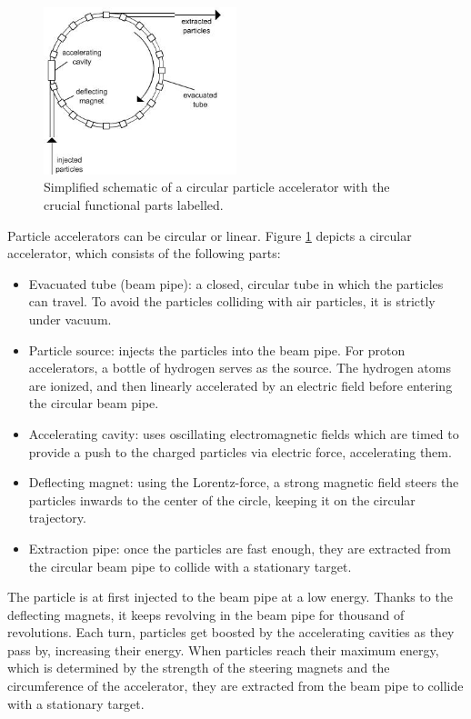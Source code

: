 \documentclass[12pt]{article}
\begin{document}
\begin{figure}[H]
	\begin{center}
		\includegraphics[width=0.5\textwidth]{particle_accelerator_schematic}
	\end{center}
	\caption[Circular particle accelerator structure]{Simplified schematic of a circular particle accelerator with the crucial functional parts labelled. \cite{accelerator_image_src_1}}
	\label{fig_part_accel_schematic}
\end{figure}

Particle accelerators can be circular or linear. Figure \ref{fig_part_accel_schematic} depicts a circular accelerator, which consists of the following parts:
\begin{itemize}
	\item Evacuated tube (beam pipe): a closed, circular tube in which the particles can travel. To avoid the particles colliding with air particles, it is strictly under vacuum.
	\item Particle source: injects the particles into the beam pipe. For proton accelerators, a bottle of hydrogen serves as the source. The hydrogen atoms are ionized, and then linearly accelerated by an electric field before entering the circular beam pipe.
	\item Accelerating cavity: uses oscillating electromagnetic fields which are timed to provide a push to the charged particles via electric force, accelerating them.
	\item Deflecting magnet: using the Lorentz-force, a strong magnetic field steers the particles inwards to the center of the circle, keeping it on the circular trajectory.
	\item Extraction pipe: once the particles are fast enough, they are extracted from the circular beam pipe to collide with a stationary target.
\end{itemize}

The particle is at first injected to the beam pipe at a low energy. Thanks to the deflecting magnets, it keeps revolving in the beam pipe for thousand of revolutions. Each turn, particles get boosted by the accelerating cavities as they pass by, increasing their energy. When particles reach their maximum energy, which is determined by the strength of the steering magnets and the circumference of the accelerator, they are extracted from the beam pipe to collide with a stationary target.
\end{document}

